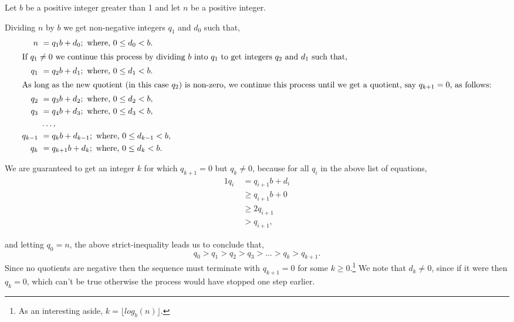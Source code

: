 \documentclass{article}
\begin{document}
Let \(b\) be a positive integer greater than 1 and
let \(n\) be a positive integer.

Dividing \(n\) by \(b\) we get non-negative integers \(q_1\) and \(d_0\) such that,
\begin{alignat*}{1}
n\ &= q_1b + d_0; \text{ where, } 0 \le{} d_0 < b.\\
\intertext{If \(q_1 \ne{} 0\) we continue this process by dividing \(b\) into \(q_1\) to get integers \(q_2\) and \(d_1\) such that,}
q_1\ &= q_2b + d_1; \text{ where, } 0 \le{} d_1 < b.\\
\intertext{As long as the new quotient (in this case \(q_2\)) is non-zero, we continue this process
until we get a quotient, say \(q_{k+1} = 0\), as follows:}
q_2\ &= q_3b + d_2; \text{ where, } 0 \le{} d_2 < b,\\
q_3\ &= q_4b + d_3; \text{ where, } 0 \le{} d_3 < b,\\
 &\dots{},\\
q_{k-1}\ &= q_{k}b + d_{k-1}; \text{ where, } 0 \le{} d_{k-1} < b,\\
q_{k}\ &= q_{k+1}b + d_k; \text{ where, } 0 \le{} d_k < b.
\end{alignat*}

We are guaranteed to get an integer \(k\) for which \(q_{k+1} = 0\) but \(q_k \ne{} 0\), because for
all \(q_i\) in the above list of equations,
\begin{alignat*}{1}
q_i\  &= q_{i+1}b + d_i\\
\ &\ge{} q_{i+1}b + 0\\
\ &\ge{} 2q_{i+1}\\
\ &> q_{i+1},
\end{alignat*}

and letting \(q_0 = n\), the above strict-inequality leads us to conclude that,
\[q_0 > q_1 > q_2 > q_3 > \dots{} > q_k > q_{k+1}.\]
Since no quotients are negative then the sequence
must terminate with \(q_{k+1} = 0\) for some \(k \ge{} 0\).\footnote{As an
interesting aside, \(k = {\lfloor}log_b(n){\rfloor}\).} We note that
\(d_k \ne{} 0\), since if it were then \(q_k = 0\), which can't be 
true otherwise the process would have stopped one step earlier.
\end{document}
